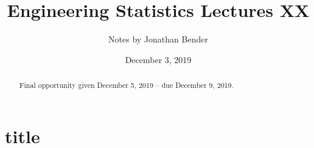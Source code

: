 \documentclass[]{article}
\title{Engineering Statistics Lectures XX}
\author{Notes by Jonathan Bender}
\date{December 3, 2019}
\begin{document}
	
	\maketitle
	
	\begin{abstract}
		Final opportunity given December 5, 2019 -- due December 9, 2019.
	\end{abstract}

	\section{title}
\end{document}
